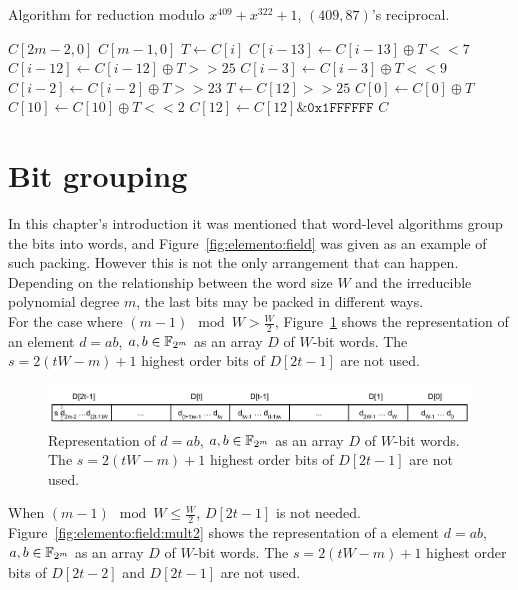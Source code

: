 \begin{algorithm}
  \caption{Algorithm for reduction modulo $x^{409} + x^{322} + 1$, $(409, 87)$'s reciprocal.}
  \label{alg:409_322}
\begin{algorithmic}[1]
  \REQUIRE $C[2m-2,0]$
  \ENSURE $C[m-1,0]$
    \STATE $T \gets C[i]$
    \STATE $C[i-13] \gets C[i-13] \oplus T << 7$
    \STATE $C[i-12] \gets C[i-12] \oplus T >> 25$
    \STATE $C[i-3] \gets C[i-3] \oplus T << 9$
    \STATE $C[i-2] \gets C[i-2] \oplus T >> 23$
  \ENDFOR
  \STATE $T \gets C[12] >> 25$
  \STATE $C[0] \gets C[0] \oplus T$
  \STATE $C[10] \gets C[10] \oplus T << 2$
  \STATE $C[12] \gets C[12] \& \texttt{0x1FFFFFF}$
  \RETURN $C$
\end{algorithmic}
\end{algorithm}

\section{Bit grouping}\label{bit-grouping}

In this chapter's introduction it was mentioned that word-level algorithms group the bits into words, and Figure~\ref{fig:elemento:field} was given as an example of such packing. However this is not the only arrangement that can happen. Depending on the relationship between the word size $W$ and the irreducible polynomial degree $m$, the last bits may be packed in different ways. \\

For the case where $(m-1) \mod{W} > \frac{W}{2}$, Figure~\ref{fig:elemento:field:mult} shows the representation of an element $d = ab$, $a,b \in {\mathbb F}_{2^m}$ as an array $D$ of $W$-bit words. The $s = 2(tW-m)+1$ highest order bits of $D[2t-1]$ are not used. \\

\begin{figure}[H]
  \centering
  \includegraphics[width = .9\columnwidth]{figures/two-word-element-1.pdf}
\caption{Representation of $d = ab$, $a,b \in {\mathbb F}_{2^m}$ as an array $D$ of $W$-bit words. The $s = 2(tW-m)+1$ highest order bits of $D[2t-1]$ are not used.}
\label{fig:elemento:field:mult}
\end{figure}

When $(m-1) \mod{W} \leq \frac{W}{2}$, $D[2t-1]$ is not needed.  Figure~\ref{fig:elemento:field:mult2} shows the representation of a element $d = ab$, $a,b \in {\mathbb F}_{2^m}$ as an array $D$ of $W$-bit words. The $s = 2(tW-m)+1$ highest order bits of $D[2t-2]$ and $D[2t-1]$ are not used. \\

